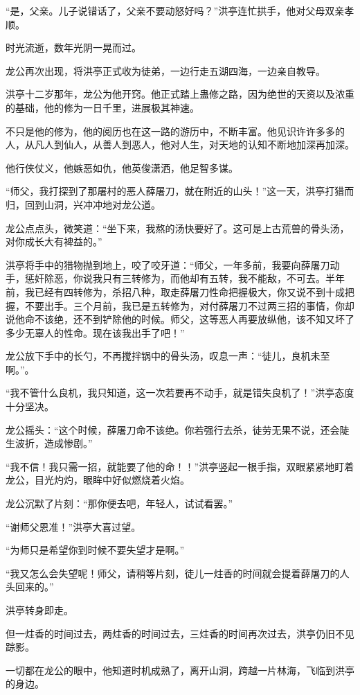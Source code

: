 \begin{this_body}
“是，父亲。儿子说错话了，父亲不要动怒好吗？”洪亭连忙拱手，他对父母双亲孝顺。

时光流逝，数年光阴一晃而过。

龙公再次出现，将洪亭正式收为徒弟，一边行走五湖四海，一边亲自教导。

洪亭十二岁那年，龙公为他开窍。他正式踏上蛊修之路，因为绝世的天资以及浓重的基础，他的修为一日千里，进展极其神速。

不只是他的修为，他的阅历也在这一路的游历中，不断丰富。他见识许许多多的人，从凡人到仙人，从善人到恶人，他对人生，对天地的认知不断地加深再加深。

他行侠仗义，他嫉恶如仇，他英俊潇洒，他足智多谋。

“师父，我打探到了那屠村的恶人薛屠刀，就在附近的山头！”这一天，洪亭打猎而归，回到山洞，兴冲冲地对龙公道。

龙公点点头，微笑道：“坐下来，我熬的汤快要好了。这可是上古荒兽的骨头汤，对你成长大有裨益的。”

洪亭将手中的猎物抛到地上，咬了咬牙道：“师父，一年多前，我要向薛屠刀动手，惩奸除恶，你说我只有三转修为，而他却有五转，我不能敌，不可去。半年前，我已经有四转修为，杀招八种，取走薛屠刀性命把握极大，你又说不到十成把握，不要出手。三个月前，我已是五转修为，对付薛屠刀不过两三招的事情，你却说他命不该绝，还不到铲除他的时候。师父，这等恶人再要放纵他，该不知又坏了多少无辜人的性命。现在该我出手了吧！”

龙公放下手中的长勺，不再搅拌锅中的骨头汤，叹息一声：“徒儿，良机未至啊。”。

“我不管什么良机，我只知道，这一次若要再不动手，就是错失良机了！”洪亭态度十分坚决。

龙公摇头：“这个时候，薛屠刀命不该绝。你若强行去杀，徒劳无果不说，还会陡生波折，造成惨剧。”

“我不信！我只需一招，就能要了他的命！！”洪亭竖起一根手指，双眼紧紧地盯着龙公，目光灼灼，眼眸中好似燃烧着火焰。

龙公沉默了片刻：“那你便去吧，年轻人，试试看罢。”

“谢师父恩准！”洪亭大喜过望。

“为师只是希望你到时候不要失望才是啊。”

“我又怎么会失望呢！师父，请稍等片刻，徒儿一炷香的时间就会提着薛屠刀的人头回来的。”

洪亭转身即走。

但一炷香的时间过去，两炷香的时间过去，三炷香的时间再次过去，洪亭仍旧不见踪影。

一切都在龙公的眼中，他知道时机成熟了，离开山洞，跨越一片林海，飞临到洪亭的身边。


\end{this_body}

